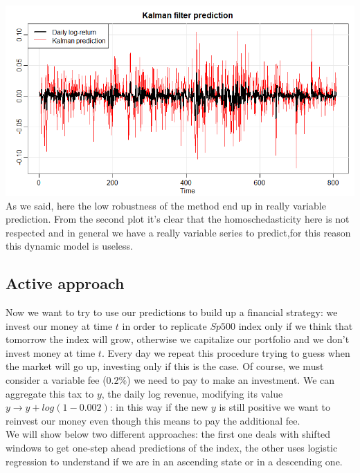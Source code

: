 \documentclass{article}%
\begin{document}
  
\includegraphics[scale=0.60]{kalmanprediction}
\\       

As we said, here the low robustness of the method end up in really variable prediction. From the second plot it's clear that the homoschedasticity here is not respected and in general we have a really variable series to predict,for this reason this dynamic model is useless.

\subsection{Active approach}
Now we want to try to use our predictions to build up a financial strategy: we invest our money at time $t$  in order to replicate $Sp500$ index only if we think that tomorrow the index will grow, otherwise we capitalize our portfolio and we don't invest money at time $t$. Every day we repeat this procedure trying to guess when the market will go up, investing only if this is the case.  Of course, we must consider a variable fee ($0.2\%$) we need to pay to make an investment.  We can aggregate this tax
to $y$, the daily log revenue, modifying its value $y\rightarrow y+log(1-0.002)$: in this way if the new $y$ is still positive we want to reinvest our money even though this means to pay the additional fee.
\\

We will show below two different approaches: the first one deals with shifted windows to get one-step ahead predictions of the index, the other uses logistic regression to understand if we are in an ascending state or in a descending one.
\end{document}

